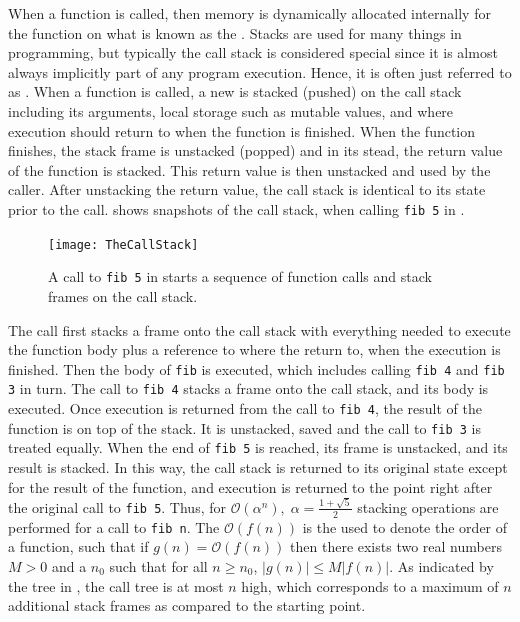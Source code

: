 When a function is called, then memory is dynamically allocated internally for the function on what is known as the . Stacks are used for many things in programming, but typically the call stack is considered special since it is almost always implicitly part of any program execution. Hence, it is often just referred to as . When a function is called, a new  is stacked (pushed) on the call stack including its arguments, local storage such as mutable values, and where execution should return to when the function is finished. When the function finishes, the stack frame is unstacked (popped) and in its stead, the return value of the function is stacked. This return value is then unstacked and used by the caller. After unstacking the return value, the call stack is identical to its state prior to the call.  shows snapshots of the call stack, when calling \lstinline{fib 5} in . 
\begin{figure}
  \centering
  \texttt{[image: TheCallStack]}
  \caption{A call to \lstinline{fib 5} in  starts a sequence of function calls and stack frames on the call stack.}
  \label{fig:TheStack}
\end{figure}
The call first stacks a frame onto the call stack with everything needed to execute the function body plus a reference to where the return to, when the execution is finished. Then the body of \lstinline{fib} is executed, which includes calling \lstinline{fib 4} and \lstinline{fib 3} in turn. The call to \lstinline{fib 4} stacks a frame onto the call stack, and its body is executed. Once execution is returned from the call to \lstinline{fib 4}, the result of the function is on top of the stack. It is unstacked, saved and the call to \lstinline{fib 3} is treated equally. When the end of \lstinline{fib 5} is reached, its frame is unstacked, and its result is stacked. In this way, the call stack is returned to its original state except for the result of the function, and execution is returned to the point right after the original call to \lstinline{fib 5}. Thus, for  $\mathcal{O}\left(\alpha^n\right),\; \alpha=\frac{1+\sqrt{5}}{2}$ stacking operations are performed for a call to \lstinline{fib n}. The $\mathcal{O}\left(f(n)\right)$ is the  used to denote the order of a function, such that if $g(n) = \mathcal{O}(f(n))$ then there exists two real numbers $M>0$ and a $n_0$ such that for all $n\geq n_0$, $|g(n)| \leq M |f(n)|$. As indicated by the tree in , the call tree is at most $n$ high, which corresponds to a maximum of $n$ additional stack frames as compared to the starting point.

